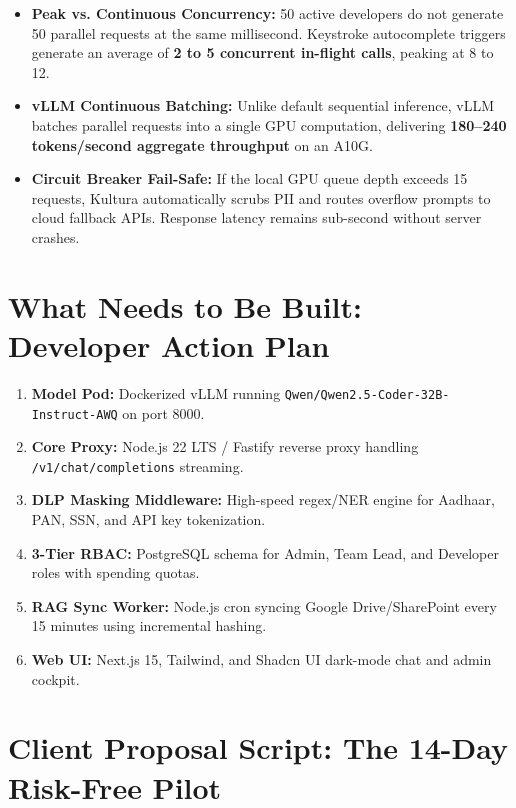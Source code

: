 \documentclass[10pt,a4paper]{article}
\begin{document}
\begin{itemize}[leftmargin=12pt, itemsep=2pt]
    \item \textbf{Peak vs. Continuous Concurrency:} 50 active developers do not generate 50 parallel requests at the same millisecond. Keystroke autocomplete triggers generate an average of \textbf{2 to 5 concurrent in-flight calls}, peaking at 8 to 12.
    \item \textbf{vLLM Continuous Batching:} Unlike default sequential inference, vLLM batches parallel requests into a single GPU computation, delivering \textbf{180--240 tokens/second aggregate throughput} on an A10G.
    \item \textbf{Circuit Breaker Fail-Safe:} If the local GPU queue depth exceeds 15 requests, Kultura automatically scrubs PII and routes overflow prompts to cloud fallback APIs. Response latency remains sub-second without server crashes.
\end{itemize}

\section{What Needs to Be Built: Developer Action Plan}

\begin{enumerate}[leftmargin=14pt, itemsep=2pt]
    \item \textbf{Model Pod:} Dockerized vLLM running \texttt{Qwen/Qwen2.5-Coder-32B-Instruct-AWQ} on port 8000.
    \item \textbf{Core Proxy:} Node.js 22 LTS / Fastify reverse proxy handling \texttt{/v1/chat/completions} streaming.
    \item \textbf{DLP Masking Middleware:} High-speed regex/NER engine for Aadhaar, PAN, SSN, and API key tokenization.
    \item \textbf{3-Tier RBAC:} PostgreSQL schema for Admin, Team Lead, and Developer roles with spending quotas.
    \item \textbf{RAG Sync Worker:} Node.js cron syncing Google Drive/SharePoint every 15 minutes using incremental hashing.
    \item \textbf{Web UI:} Next.js 15, Tailwind, and Shadcn UI dark-mode chat and admin cockpit.
\end{enumerate}

\section{Client Proposal Script: The 14-Day Risk-Free Pilot}
\end{document}
